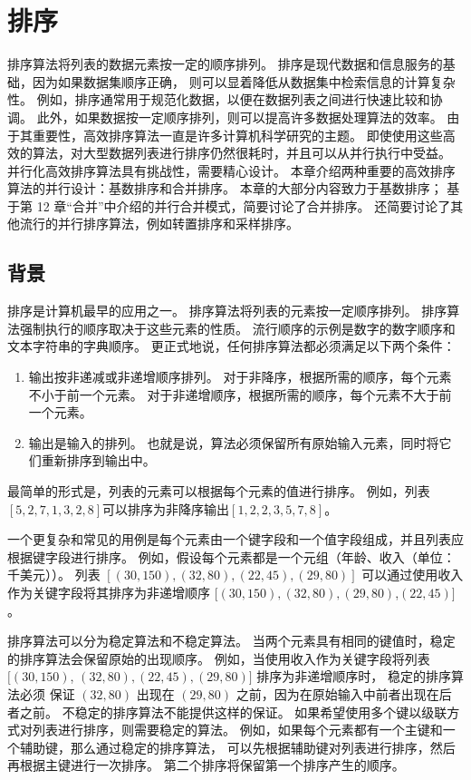 \section{排序}
排序算法将列表的数据元素按一定的顺序排列。 排序是现代数据和信息服务的基础，因为如果数据集顺序正确，
则可以显着降低从数据集中检索信息的计算复杂性。 例如，排序通常用于规范化数据，以便在数据列表之间进行快速比较和协调。 
此外，如果数据按一定顺序排列，则可以提高许多数据处理算法的效率。 
由于其重要性，高效排序算法一直是许多计算机科学研究的主题。 
即使使用这些高效的算法，对大型数据列表进行排序仍然很耗时，并且可以从并行执行中受益。 
并行化高效排序算法具有挑战性，需要精心设计。 本章介绍两种重要的高效排序算法的并行设计：基数排序和合并排序。 
本章的大部分内容致力于基数排序； 基于第 12 章“合并”中介绍的并行合并模式，简要讨论了合并排序。 
还简要讨论了其他流行的并行排序算法，例如转置排序和采样排序。

\subsection{背景}
排序是计算机最早的应用之一。 排序算法将列表的元素按一定顺序排列。 排序算法强制执行的顺序取决于这些元素的性质。 
流行顺序的示例是数字的数字顺序和文本字符串的字典顺序。 更正式地说，任何排序算法都必须满足以下两个条件：
\begin{enumerate}
   \item 输出按非递减或非递增顺序排列。 对于非降序，根据所需的顺序，每个元素不小于前一个元素。 
   		对于非递增顺序，根据所需的顺序，每个元素不大于前一个元素。

   \item 输出是输入的排列。 也就是说，算法必须保留所有原始输入元素，同时将它们重新排序到输出中。
\end{enumerate}

最简单的形式是，列表的元素可以根据每个元素的值进行排序。 例如，列表$[5,2,7,1,3,2,8]$可以排序为非降序输出$[1,2,2,3,5,7,8]$。

一个更复杂和常见的用例是每个元素由一个键字段和一个值字段组成，并且列表应根据键字段进行排序。 
例如，假设每个元素都是一个元组（年龄、收入（单位：千美元））。 
列表 $[(30,150),(32,80),(22,45),(29,80)]$ 可以通过使用收入
作为关键字段将其排序为非递增顺序 $[(30,150),(32 ,80),(29,80)$,$(22,45)]$。

排序算法可以分为稳定算法和不稳定算法。 当两个元素具有相同的键值时，稳定的排序算法会保留原始的出现顺序。 
例如，当使用收入作为关键字段将列表 $[(30,150)$, $(32,80),(22,45),(29,80)]$ 排序为非递增顺序时，
稳定的排序算法必须 保证 $(32,80)$ 出现在 $(29,80)$ 之前，因为在原始输入中前者出现在后者之前。 
不稳定的排序算法不能提供这样的保证。 如果希望使用多个键以级联方式对列表进行排序，则需要稳定的算法。 
例如，如果每个元素都有一个主键和一个辅助键，那么通过稳定的排序算法，
可以先根据辅助键对列表进行排序，然后再根据主键进行一次排序。 第二个排序将保留第一个排序产生的顺序。

